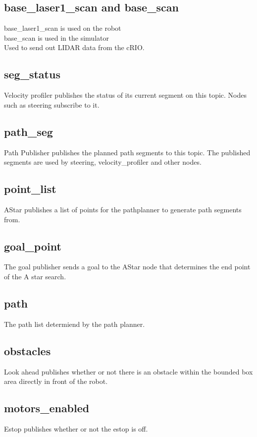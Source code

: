 \subsection{base\_laser1\_scan and base\_scan}
base\_laser1\_scan is used on the robot\\
base\_scan is used in the simulator\\

\noindent Used to send out LIDAR data from the cRIO.

\subsection{seg\_status}
Velocity profiler publishes the status of its current segment on this
topic.  Nodes such as steering subscribe to it.


\subsection{path\_seg}
Path Publisher publishes the planned path segments to this topic.  The
published segments are used by steering, velocity\_profiler and other nodes.

\subsection{point\_list}
AStar publishes a list of points for the pathplanner to generate path segments from.
\subsection{goal\_point}
The goal publisher sends a goal to the AStar node that determines the end point of the A star search.
\subsection{path}
The path list determiend by the path planner.
\subsection{obstacles}
Look ahead publishes whether or not there is an obstacle within the bounded box area directly in front of the robot.
\subsection{motors\_enabled}
Estop publishes whether or not the estop is off.
